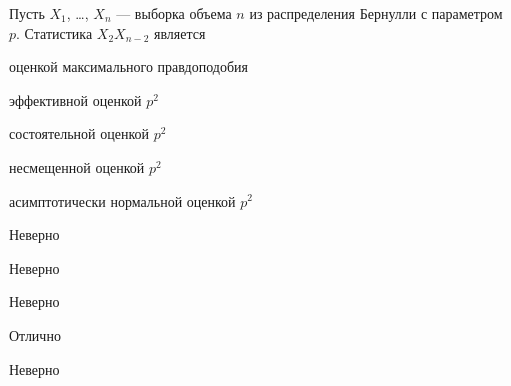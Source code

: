 
\begin{question}
Пусть \(X_1\), \ldots, \(X_n\) — выборка объема \(n\) из распределения
Бернулли с параметром \(p\). Статистика \(X_2 X_{n-2}\) является
\begin{answerlist}
  \item оценкой максимального правдоподобия
  \item эффективной оценкой \(p^2\)
  \item состоятельной оценкой \(p^2\)
  \item несмещенной оценкой \(p^2\)
  \item асимптотически нормальной оценкой \(p^2\)
\end{answerlist}
\end{question}

\begin{solution}
\begin{answerlist}
  \item Неверно
  \item Неверно
  \item Неверно
  \item Отлично
  \item Неверно
\end{answerlist}
\end{solution}

